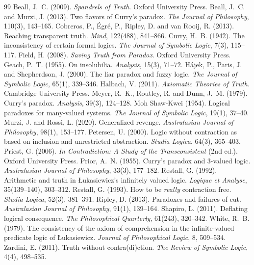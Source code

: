 \documentclass{situationist-preprint}
\begin{document}
\begin{thebibliography}{99}\small
{} Beall, J.~C. (2009). \emph{Spandrels of Truth}. Oxford University Press.
 Beall, J.~C. and Murzi, J. (2013). Two flavors of Curry's paradox. \emph{The Journal of Philosophy}, 110(3), 143--165.
 Cobreros, P., Égré, P., Ripley, D. and van Rooij, R. (2013). Reaching transparent truth. \emph{Mind}, 122(488), 841--866.
 Curry, H.~B. (1942). The inconsistency of certain formal logics. \emph{The Journal of Symbolic Logic}, 7(3), 115--117.
 Field, H. (2008). \emph{Saving Truth from Paradox}. Oxford University Press.
 Geach, P.~T. (1955). On insolubilia. \emph{Analysis}, 15(3), 71--72.
 Hájek, P., Paris, J. and Shepherdson, J. (2000). The liar paradox and fuzzy logic. \emph{The Journal of Symbolic Logic}, 65(1), 339--346.
 Halbach, V. (2011). \emph{Axiomatic Theories of Truth}. Cambridge University Press.
 Meyer, R.~K., Routley, R. and Dunn, J.~M. (1979). Curry's paradox. \emph{Analysis}, 39(3), 124--128.
 Moh Shaw-Kwei (1954). Logical paradoxes for many-valued systems. \emph{The Journal of Symbolic Logic}, 19(1), 37--40.
 Murzi, J. and Rossi, L. (2020). Generalized revenge. \emph{Australasian Journal of Philosophy}, 98(1), 153--177.
 Petersen, U. (2000). Logic without contraction as based on inclusion and unrestricted abstraction. \emph{Studia Logica}, 64(3), 365--403.
 Priest, G. (2006). \emph{In Contradiction: A Study of the Transconsistent} (2nd ed.). Oxford University Press.
 Prior, A.~N. (1955). Curry's paradox and 3-valued logic. \emph{Australasian Journal of Philosophy}, 33(3), 177--182.
 Restall, G. (1992). Arithmetic and truth in Łukasiewicz's infinitely valued logic. \emph{Logique et Analyse}, 35(139--140), 303--312.
 Restall, G. (1993). How to be \emph{really} contraction free. \emph{Studia Logica}, 52(3), 381--391.
 Ripley, D. (2013). Paradoxes and failures of cut. \emph{Australasian Journal of Philosophy}, 91(1), 139--164.
 Shapiro, L. (2011). Deflating logical consequence. \emph{The Philosophical Quarterly}, 61(243), 320--342.
 White, R.~B. (1979). The consistency of the axiom of comprehension in the infinite-valued predicate logic of Łukasiewicz. \emph{Journal of Philosophical Logic}, 8, 509--534.
 Zardini, E. (2011). Truth without contra(di)ction. \emph{The Review of Symbolic Logic}, 4(4), 498--535.
\end{thebibliography}
\end{document}
